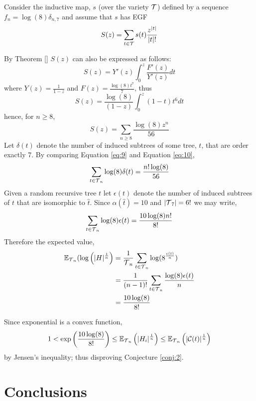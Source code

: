 Consider the inductive map, $s$  (over the variety $\operatorname{\mathcal{T}}$) defined by a sequence $f_n = \log(8)\delta_{n,7}$ and assume that $s$ has EGF
\begin{equation}\label{eq:9}
  S(z) = \sum_{t \in \operatorname{\mathcal{T}}} s(t)\frac{z^{\lvert t \rvert}}{\lvert t \rvert !}
\end{equation}


By Theorem \ref{} $S(z)$ can also be expressed as follows:
\[
 S(z) = Y'(z) \int_0^z \frac{F'(z)}{Y'(z)} dt
\]
where $Y(z) = \frac{1}{1-z}$ and $F(z) = \frac{\log(8)t^7}{7}$, thus
\[
 S(z) = \frac{\log(8)}{(1-z)}\int_0^z(1-t)t^6 dt
\]
hence, for $n \geq 8$,
\begin{equation}\label{eq:10}
 S(z) = \sum_{n \geq 8} \frac{\log(8)z^n}{56}
\end{equation}
Let $\delta(t)$ denote the number of induced subtrees of some tree, $t$, that are order exactly 7.  By comparing Equation \ref{eq:9} and Equation \ref{eq:10},
\[
 \sum_{t \in \operatorname{\mathcal{T}}_n}\log(8)\delta(t) = \frac{n!\log(8)}{56}
\]
Given a random recursive tree $t$ let $\epsilon(t)$ denote the number of induced subtrees of $t$ that are isomorphic to $\hat{t}$. Since $\alpha(\hat{t}) = 10$ and $\lvert \operatorname{\mathcal{T}}_7 \rvert = 6!$ we may write,
\[
 \sum_{t \in \operatorname{\mathcal{T}}_n}\log(8)\epsilon(t) = \frac{10\log(8)n!}{8!}
\]
Therefore the expected value, 
\begin{align}
 \mathbb{E}_{\operatorname{\mathcal{T}}_n}(\log\left(\lvert H \rvert^{\frac{1}{n}}\right) &= \frac{1}{\operatorname{\mathcal{T}}_n}\sum_{t \in \operatorname{\mathcal{T}}_n} \log(8^{\frac{\epsilon(t)}{n}}) \\
 &= \frac{1}{(n-1)!}\sum_{t \in \operatorname{\mathcal{T}}_n} \frac{\log(8)\epsilon(t)}{n} \\
 &= \frac{10\log(8)}{8!}
\end{align}

Since exponential is a convex function,
\[
 1 < \exp\left( \frac{10\log(8)}{8!}\right) \leq \mathbb{E}_{\operatorname{\mathcal{T}}_n}\left( \lvert H_i \rvert^{\frac{1}{n}}\right) \leq \mathbb{E}_{\operatorname{\mathcal{T}}_n} \left( \lvert \mathcal{C}(t) \rvert^{\frac{1}{n}}   \right)
\]
by Jensen's inequality; thus disproving Conjecture \ref{conj:2}.  
\section{Conclusions}\label{sec:conc}

